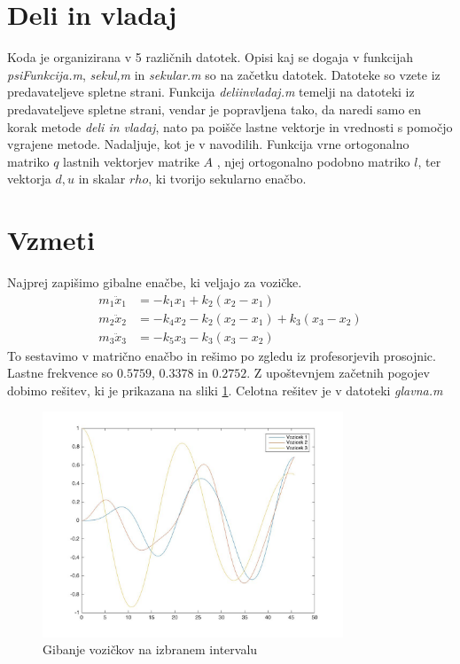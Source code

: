 \documentclass[a4paper,12pt]{article}
\begin{document}
\section{Deli in vladaj}
Koda je organizirana v 5 različnih datotek. Opisi kaj se dogaja v funkcijah \emph{psiFunkcija.m}, \emph{sekul,m} in \emph{sekular.m} so na začetku datotek. Datoteke so vzete iz predavateljeve spletne strani.  Funkcija \emph{deliinvladaj.m} temelji na datoteki iz predavateljeve spletne strani, vendar je popravljena tako, da naredi samo en korak metode \emph{deli in vladaj}, nato pa poišče lastne vektorje in vrednosti s pomočjo vgrajene metode. Nadaljuje, kot je v navodilih. Funkcija vrne ortogonalno matriko $q$ lastnih vektorjev matrike $A$ , njej ortogonalno podobno matriko $l$, ter vektorja $d, u$ in skalar $rho$, ki tvorijo sekularno enačbo. 

\section{Vzmeti}
Najprej zapišimo gibalne enačbe, ki veljajo za vozičke. 
\begin{align*}
	m_1\ddot{x}_1 &= -k_1x_1 + k_2(x_2-x_1) \\
	m_2\ddot{x}_2 &= -k_4x_2 - k_2(x_2-x_1)+ k_3(x_3-x_2) \\
	m_3\ddot{x}_3 &= -k_5x_3 - k_3(x_3-x_2)
\end{align*}
To sestavimo v matrično enačbo in rešimo po zgledu iz profesorjevih prosojnic. Lastne frekvence so  $0.5759$, $0.3378$ in $0.2752$. Z upoštevnjem začetnih pogojev dobimo rešitev, ki je prikazana na sliki \ref{vozicki}. Celotna rešitev je v datoteki \emph{glavna.m}


\begin{figure}[h]
	\centering
	\caption{Gibanje vozičkov na izbranem intervalu}
	\label{vozicki}
	\includegraphics[width=0.80\textwidth]{vozicki.jpg}
\end{figure}
 
\end{document}
